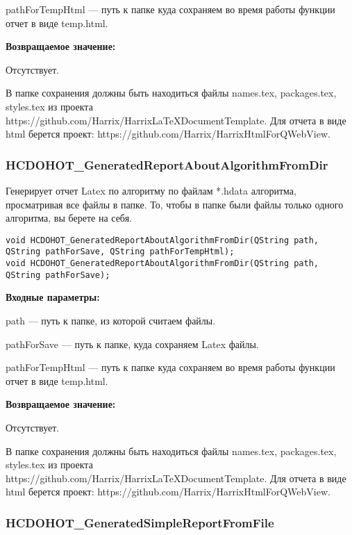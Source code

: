 \documentclass[a4paper,12pt]{article}
\begin{document}
pathForTempHtml --- путь к папке куда сохраняем во время работы функции отчет в виде temp.html.

\textbf{Возвращаемое значение:}

Отсутствует.

В папке сохранения должны быть находиться файлы names.tex, packages.tex, styles.tex из проекта https://github.com/Harrix/HarrixLaTeXDocumentTemplate. Для отчета в виде html берется проект: https://github.com/Harrix/HarrixHtmlForQWebView.


\subsubsection{HCDOHOT\_GeneratedReportAboutAlgorithmFromDir}\label{HCDOHOT_GeneratedReportAboutAlgorithmFromDir}

Генерирует отчет Latex по алгоритму по файлам *.hdata алгоритма, просматривая все файлы в папке. То, чтобы в папке были файлы только одного алгоритма, вы берете на себя.


\begin{lstlisting}[label=code_syntax_HCDOHOT_GeneratedReportAboutAlgorithmFromDir,caption=Синтаксис]
void HCDOHOT_GeneratedReportAboutAlgorithmFromDir(QString path, QString pathForSave, QString pathForTempHtml);
void HCDOHOT_GeneratedReportAboutAlgorithmFromDir(QString path, QString pathForSave);
\end{lstlisting}

\textbf{Входные параметры:}

path --- путь к папке, из которой считаем файлы.

pathForSave --- путь к папке, куда сохраняем Latex файлы.

pathForTempHtml --- путь к папке куда сохраняем во время работы функции отчет в виде temp.html.

\textbf{Возвращаемое значение:}

Отсутствует.

В папке сохранения должны быть находиться файлы names.tex, packages.tex, styles.tex из проекта https://github.com/Harrix/HarrixLaTeXDocumentTemplate. Для отчета в виде html берется проект: https://github.com/Harrix/HarrixHtmlForQWebView.


\subsubsection{HCDOHOT\_GeneratedSimpleReportFromFile}\label{HCDOHOT_GeneratedSimpleReportFromFile}
\end{document}
